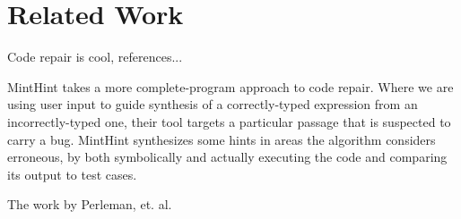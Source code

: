 \section{Related Work}
\label{sec:related}

Code repair is cool, references...

MintHint \citep{MintHint} takes a more complete-program approach to code repair. Where we are using user input to guide synthesis of a correctly-typed expression from an incorrectly-typed one, their tool targets a particular passage that is suspected to carry a bug. MintHint synthesizes some hints in areas the algorithm considers erroneous, by both symbolically and actually executing the code and comparing its output to test cases.

The work by Perleman, et. al. \cite{PerelmanGBG12}
